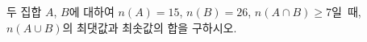두 집합 $A$, $B$에 대하여 $n(A)=15$, $n(B)=26$, \mbox{$n(A\cap B)\ge 7$일 때,} $n(A\cup B)$의 최댓값과 최솟값의 합을 구하시오.
